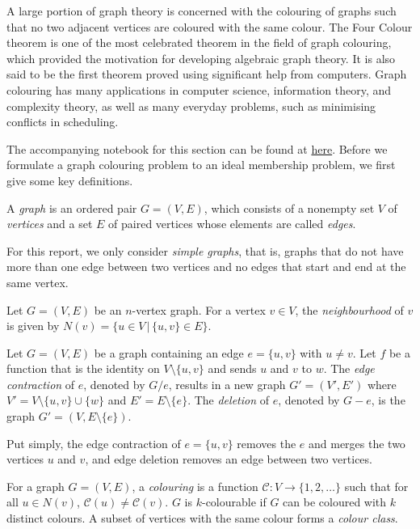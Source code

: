 \documentclass[../main.tex]{subfiles}
\begin{document}
    A large portion of graph theory is concerned with the colouring of graphs such that no two adjacent vertices are coloured with the same colour. The Four Colour theorem \cite{gonthier2008formal} is one of the most celebrated theorem in the field of graph colouring, which provided the motivation for developing algebraic graph theory. It is also said to be the first theorem proved using significant help from computers. Graph colouring has many applications in computer science, information theory, and complexity theory, as well as many everyday problems, such as minimising conflicts in scheduling. 
    
    \begin{sloppypar}
    The accompanying notebook for this section can be found at \href{https://github.com/yangdabei/graph-colouring-and-sudoku/blob/main/example_graph_colouring.ipynb}{here}. Before we formulate a graph colouring problem to an ideal membership problem, we first give some key definitions.
    \end{sloppypar}

    \begin{definition}
        A \emph{graph} is an ordered pair $G=(V,E)$, which consists of a nonempty set $V$ of \emph{vertices} and a set $E$ of paired vertices whose elements are called \emph{edges}.
    \end{definition}
    For this report, we only consider \emph{simple graphs}, that is, graphs that do not have more than one edge between two vertices and no edges that start and end at the same vertex. 
    \begin{definition}
        Let $G=(V,E)$ be an $n$-vertex graph. For a vertex $v\in V$, the \emph{neighbourhood} of $v$ is given by $N(v)=\{u\in V\, |\, \{u,v\}\in E\}$. 
    \end{definition}
    \begin{definition}
        Let $G=(V,E)$ be a graph containing an edge $e = \{u,v\}$ with $u\neq v$. Let $f$ be a function that is the identity on $V\setminus \{u,v\}$ and sends $u$ and $v$ to $w$. The \emph{edge contraction} of $e$, denoted by $G/e$, results in a new graph $G'=(V', E')$ where $V'=V\setminus \{u,v\} \cup \{w\}$ and $E'=E\setminus \{e\}$. The \emph{deletion} of $e$, denoted by $G-e$, is the graph $G'=(V,E\setminus \{e\})$.
    \end{definition}
    Put simply, the edge contraction of $e=\{u,v\}$ removes the $e$ and merges the two vertices $u$ and $v$, and edge deletion removes an edge between two vertices.
    \begin{definition}
        For a graph $G=(V,E)$, a \emph{colouring} is a function $\mathcal{C}:V\to \{1,2,\dots\}$ such that for all $u\in N(v)$, $\mathcal{C}(u)\neq\mathcal{C}(v)$. $G$ is $k$-colourable if $G$ can be coloured with $k$ distinct colours. A subset of vertices with the same colour forms a \emph{colour class}.
    \end{definition}
\end{document}
